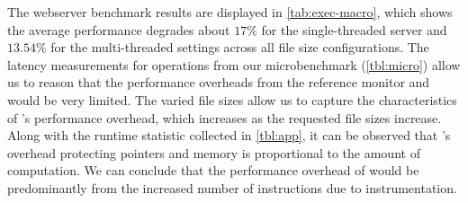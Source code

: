 The webserver benchmark results are displayed in \autoref{tab:exec-macro}, which shows the average performance degrades about $17\%$ for the single-threaded server and $13.54\%$ for the multi-threaded settings across all file size configurations.
The latency measurements for \thename operations from our microbenchmark (\autoref{tbl:micro}) allow us to reason that the performance overheads from the reference monitor and \libcapac would be very limited.
The varied file sizes allow us to capture the characteristics of \thename's performance overhead, which increases as the requested file sizes increase.
Along with the runtime statistic collected in \autoref{tbl:app}, it can be observed that \thename's overhead protecting pointers and memory is proportional to the amount of computation.
We can conclude that the performance overhead of \thename would be predominantly from the increased number of instructions due to instrumentation.






















